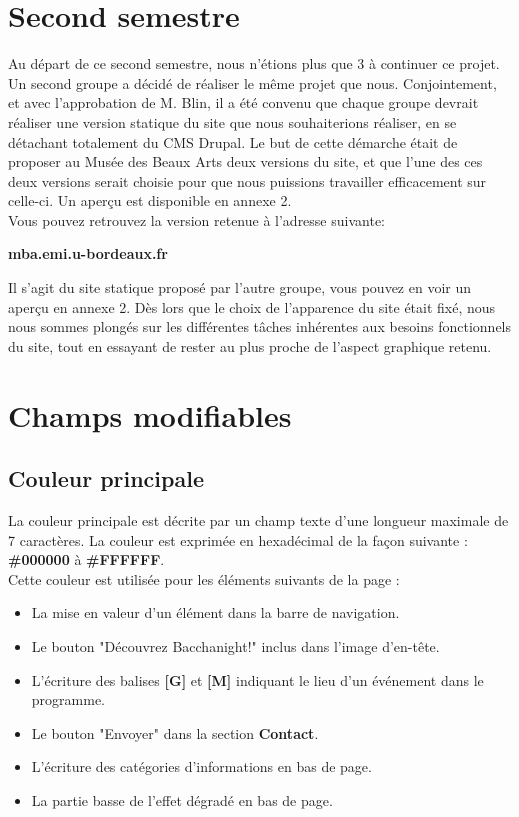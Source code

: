 \documentclass[11pt]{report}
\begin{document}
\vspace{0.5cm}

\section{Second semestre}

Au départ de ce second semestre, nous n'étions plus que 3 à continuer ce projet.
Un second groupe a décidé de réaliser le même projet que nous. Conjointement,
et avec l'approbation de M. Blin, il a été convenu que chaque groupe devrait
réaliser une version statique du site que nous souhaiterions réaliser, en se
détachant totalement du CMS Drupal. Le but de cette démarche était de proposer au
Musée des Beaux Arts deux versions du site, et que l'une des ces deux versions serait
choisie pour que nous puissions travailler efficacement sur celle-ci. Un aperçu
est disponible en annexe 2. \\
Vous pouvez retrouvez la version retenue à l'adresse suivante:

\vspace{0.5cm}

\textbf{mba.emi.u-bordeaux.fr}\\

\par
Il s'agit du site statique proposé par l'autre groupe, vous pouvez en voir un
aperçu en annexe 2. Dès lors que le choix de l'apparence du site était fixé,
nous nous sommes plongés sur les différentes tâches inhérentes aux besoins
fonctionnels du site, tout en essayant de rester au plus proche de l'aspect
graphique retenu.

\newpage
\section{Champs modifiables}

\subsection{Couleur principale}

La couleur principale est décrite par un champ texte d'une longueur maximale de
7 caractères. La couleur est exprimée en hexadécimal de la façon suivante :
\textbf{\#000000} à \textbf{\#FFFFFF}. \\
Cette couleur est utilisée pour les éléments suivants de la page :
\begin{itemize}
	\item La mise en valeur d'un élément dans la barre de navigation.
	\item Le bouton "Découvrez Bacchanight!" inclus dans l'image d'en-tête.
	\item L'écriture des balises \textbf{[G]} et \textbf{[M]} indiquant le lieu d'un événement dans le programme.
	\item Le bouton "Envoyer" dans la section \textbf{Contact}.
	\item L'écriture des catégories d'informations en bas de page.
	\item La partie basse de l'effet dégradé en bas de page.
\end{itemize}
\end{document}

